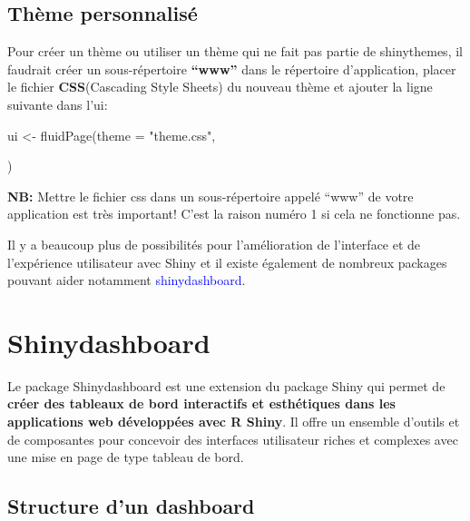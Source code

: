 \documentclass[
]{article}
\newenvironment{Shaded}{\begin{snugshade}}{\end{snugshade}}
\newcommand{\AttributeTok}[1]{\textcolor[rgb]{0.77,0.63,0.00}{#1}}
\newcommand{\FunctionTok}[1]{\textcolor[rgb]{0.00,0.00,0.00}{#1}}
\newcommand{\NormalTok}[1]{#1}
\newcommand{\OtherTok}[1]{\textcolor[rgb]{0.56,0.35,0.01}{#1}}
\newcommand{\StringTok}[1]{\textcolor[rgb]{0.31,0.60,0.02}{#1}}
\begin{document}
\hypertarget{thuxe8me-personnalisuxe9}{%
\subsection{Thème personnalisé}\label{thuxe8me-personnalisuxe9}}

Pour créer un thème ou utiliser un thème qui ne fait pas partie de
shinythemes, il faudrait créer un sous-répertoire \textbf{``www''} dans
le répertoire d'application, placer le fichier \textbf{CSS}(Cascading
Style Sheets) du nouveau thème et ajouter la ligne suivante dans l'ui:

\begin{Shaded}
\begin{Highlighting}[]
\NormalTok{ui }\OtherTok{\textless{}{-}} \FunctionTok{fluidPage}\NormalTok{(}\AttributeTok{theme =} \StringTok{"theme.css"}\NormalTok{,}
                
\NormalTok{)}
\end{Highlighting}
\end{Shaded}

\textbf{NB:} Mettre le fichier css dans un sous-répertoire appelé
``www'' de votre application est très important! C'est la raison numéro
1 si cela ne fonctionne pas.

Il y a beaucoup plus de possibilités pour l'amélioration de l'interface
et de l'expérience utilisateur avec Shiny et il existe également de
nombreux packages pouvant aider notamment
\textcolor{blue}{shinydashboard}.

\newpage

\hypertarget{shinydashboard}{%
\section{Shinydashboard}\label{shinydashboard}}

Le package Shinydashboard est une extension du package Shiny qui permet
de \textbf{créer des tableaux de bord interactifs et esthétiques dans
les applications web développées avec R Shiny}. Il offre un ensemble
d'outils et de composantes pour concevoir des interfaces utilisateur
riches et complexes avec une mise en page de type tableau de bord.

\hypertarget{structure-dun-dashboard}{%
\subsection{Structure d'un dashboard}\label{structure-dun-dashboard}}
\end{document}
